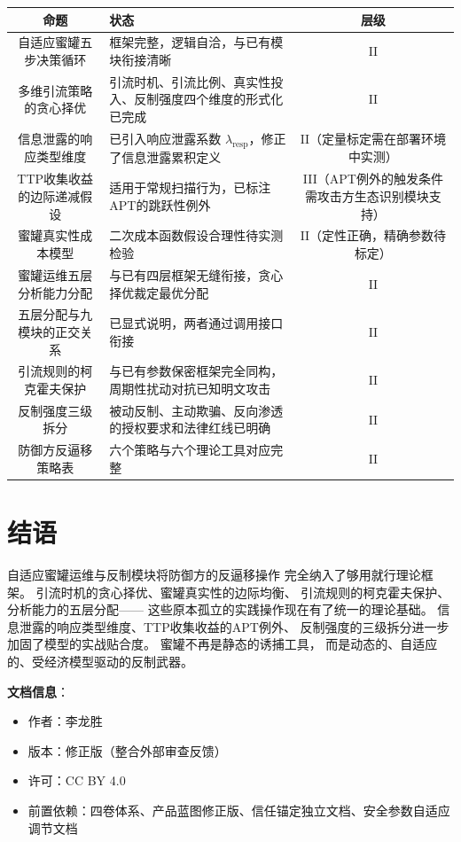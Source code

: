 \documentclass[11pt,a4paper]{article}
\begin{document}
\begin{center}
\begin{xltabular}{\textwidth}{c|X|c}
\toprule
\textbf{命题} & \textbf{状态} & \textbf{层级} \\
\midrule
自适应蜜罐五步决策循环 &
框架完整，逻辑自洽，与已有模块衔接清晰 &
II \\
多维引流策略的贪心择优 &
引流时机、引流比例、真实性投入、反制强度四个维度的形式化已完成 &
II \\
信息泄露的响应类型维度 &
已引入响应泄露系数 $\lambda_{\text{resp}}$，修正了信息泄露累积定义 &
II（定量标定需在部署环境中实测） \\
TTP收集收益的边际递减假设 &
适用于常规扫描行为，已标注APT的跳跃性例外 &
III（APT例外的触发条件需攻击方生态识别模块支持） \\
蜜罐真实性成本模型 &
二次成本函数假设合理性待实测检验 &
II（定性正确，精确参数待标定） \\
蜜罐运维五层分析能力分配 &
与已有四层框架无缝衔接，贪心择优裁定最优分配 &
II \\
五层分配与九模块的正交关系 &
已显式说明，两者通过调用接口衔接 &
II \\
引流规则的柯克霍夫保护 &
与已有参数保密框架完全同构，周期性扰动对抗已知明文攻击 &
II \\
反制强度三级拆分 &
被动反制、主动欺骗、反向渗透的授权要求和法律红线已明确 &
II \\
防御方反逼移策略表 &
六个策略与六个理论工具对应完整 &
II \\
\bottomrule
\end{xltabular}
\end{center}

\section{结语}

自适应蜜罐运维与反制模块将防御方的反逼移操作
完全纳入了够用就行理论框架。
引流时机的贪心择优、蜜罐真实性的边际均衡、
引流规则的柯克霍夫保护、分析能力的五层分配——
这些原本孤立的实践操作现在有了统一的理论基础。
信息泄露的响应类型维度、TTP收集收益的APT例外、
反制强度的三级拆分进一步加固了模型的实战贴合度。
蜜罐不再是静态的诱捕工具，
而是动态的、自适应的、受经济模型驱动的反制武器。

\vspace{5mm}
\noindent\textbf{文档信息}：
\begin{itemize}
    \item 作者：李龙胜
    \item 版本：修正版（整合外部审查反馈）
    \item 许可：CC BY 4.0
    \item 前置依赖：四卷体系、产品蓝图修正版、信任锚定独立文档、安全参数自适应调节文档
\end{itemize}
\end{document}
